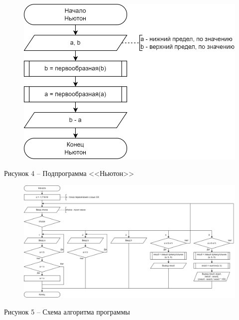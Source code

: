 \documentclass[a4paper,14pt]{extarticle}
\begin{document}
	\pagebreak
	\begin{figure}[h]
		\centering
		\includegraphics[width=0.6\linewidth]{images/s-3}
	\end{figure}
	\begin{center}
		Рисунок 4 – Подпрограмма <<Ньютон>>
	\end{center}
	
	\begin{figure}[h]
		\centering
		\includegraphics[width=1\linewidth]{images/s-5}
	\end{figure}
	\begin{center}
		Рисунок 5 – Схема алгоритма программы
	\end{center}
	
\end{document}
